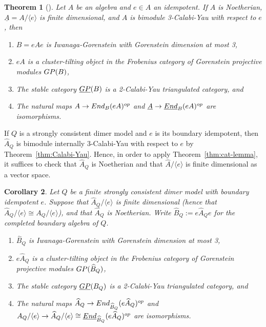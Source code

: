 \documentclass{article}
\newtheorem{thm}{Theorem}[section]
\newtheorem{cor}[thm]{Corollary}
\theoremstyle{definition}
\begin{document}
\begin{thm}[{\cite[Theorem 4.1 and Theorem 4.10]{AIRX}\label{AIR}\label{thm:cat-lemma}}]
	Let $A$ be an algebra and $e\in A$ an idempotent. If $A$ is Noetherian, $\underline A=A/\langle e\rangle$ is finite dimensional, and $A$ is bimodule 3-Calabi-Yau with respect to $e$, then
	\begin{enumerate}
		\item $B=eAe$ is Iwanaga-Gorenstein with Gorenstein dimension at most 3,
		\item $eA$ is a cluster-tilting object in the Frobenius category of Gorenstein projective modules $\textup{GP}(B)$,
		\item The stable category $\underline{\textup{GP}}(B)$ is a 2-Calabi-Yau triangulated category, and
		\item The natural maps $A\to\textup{End}_B(eA)^{op}$ and $\underline{A}\to\underline{\textup{End}}_B(eA)^{op}$ are isomorphisms.
	\end{enumerate}
\end{thm}

If $Q$ is a strongly consistent dimer model and $e$ is its boundary idempotent, then $\widehat A_Q$ is bimodule internally 3-Calabi-Yau with respect to $e$ by Theorem~\ref{thm:Calabi-Yau}. 
Hence, in order to apply Theorem~\ref{thm:cat-lemma}, it suffices to check that $\widehat A_Q$ is Noetherian and that $\widehat A/\langle e\rangle$ is finite dimensional as a vector space.

\begin{cor}\label{thm:cat-thm}
	Let $Q$ be a finite strongly consistent dimer model 
	with boundary idempotent $e$. Suppose that $\widehat A_Q/\langle e\rangle$ is finite dimensional (hence that $\widehat A_Q/\langle e\rangle\cong A_Q/\langle e\rangle$), and that $\widehat A_Q$ is Noetherian. Write $\widehat B_Q:=e\widehat A_Qe$ for the completed boundary algebra of $Q$.
	\begin{enumerate}
		\item $\widehat B_Q$ is Iwanaga-Gorenstein with Gorenstein dimension at most 3,
		\item $e\widehat A_Q$ is a cluster-tilting object in the Frobenius category of Gorenstein projective modules $\textup{GP}(\widehat B_Q)$,
		\item The stable category $\underline{\textup{GP}}(B_Q)$ is a 2-Calabi-Yau triangulated category, and
		\item \label{en:4}The natural maps $\widehat A_Q\to\textup{End}_{\widehat B_Q}(e\widehat A_Q)^{op}$ 
		and $A_Q/\langle e\rangle\to\widehat A_Q/\langle e\rangle\cong\underline{\textup{End}}_{\widehat B_Q}(e\widehat A_Q)^{op}$ are isomorphisms.
	\end{enumerate}

\end{cor}
\end{document}
